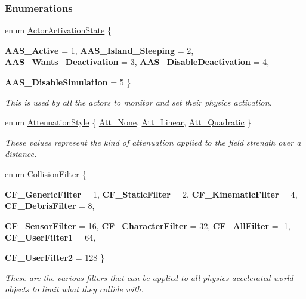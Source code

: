 \subsubsection*{Enumerations}
\begin{DoxyCompactItemize}
\item 
enum \hyperlink{namespacephys_a7d434b1a52cf5290a9ecc972b87a6a40}{ActorActivationState} \{ \par
{\bfseries AAS\_\-Active} =  1, 
{\bfseries AAS\_\-Island\_\-Sleeping} =  2, 
{\bfseries AAS\_\-Wants\_\-Deactivation} =  3, 
{\bfseries AAS\_\-DisableDeactivation} =  4, 
\par
{\bfseries AAS\_\-DisableSimulation} =  5
 \}
\begin{DoxyCompactList}\small\item\em This is used by all the actors to monitor and set their physics activation. \item\end{DoxyCompactList}\item 
enum \hyperlink{namespacephys_ad4ce7ee5c1cc164f2ea3d5f28211739f}{AttenuationStyle} \{ \hyperlink{namespacephys_ad4ce7ee5c1cc164f2ea3d5f28211739faec47e7157a10201b7aef0c1cbb6ccb5d}{Att\_\-None}, 
\hyperlink{namespacephys_ad4ce7ee5c1cc164f2ea3d5f28211739fabcceb16182220293f2260edb41b548f1}{Att\_\-Linear}, 
\hyperlink{namespacephys_ad4ce7ee5c1cc164f2ea3d5f28211739fac9ef08c39daa338975f4f8879e86100b}{Att\_\-Quadratic}
 \}
\begin{DoxyCompactList}\small\item\em These values represent the kind of attenuation applied to the field strength over a distance. \item\end{DoxyCompactList}\item 
enum \hyperlink{namespacephys_aa69523df12b54123e76c40734556ca35}{CollisionFilter} \{ \par
{\bfseries CF\_\-GenericFilter} =  1, 
{\bfseries CF\_\-StaticFilter} =  2, 
{\bfseries CF\_\-KinematicFilter} =  4, 
{\bfseries CF\_\-DebrisFilter} =  8, 
\par
{\bfseries CF\_\-SensorFilter} =  16, 
{\bfseries CF\_\-CharacterFilter} =  32, 
{\bfseries CF\_\-AllFilter} =  -\/1, 
{\bfseries CF\_\-UserFilter1} =  64, 
\par
{\bfseries CF\_\-UserFilter2} =  128
 \}
\begin{DoxyCompactList}\small\item\em These are the various filters that can be applied to all physics accelerated world objects to limit what they collide with. \item\end{DoxyCompactList}\item 

\end{DoxyCompactItemize}
